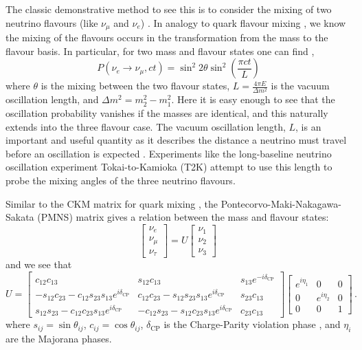 The classic demonstrative method to see this is to consider the mixing of two neutrino flavours (like $\nu_{\mu}$ and $\nu_{e}$) \cite{solar_nu}. In analogy to quark flavour mixing \cite{pdg_ckm}, we know the mixing of the flavours occurs in the transformation from the mass to the flavour basis. In particular, for two mass and flavour states one can find \cite{solar_nu},
\begin{equation}
  P(\nu_{e} \to \nu_{\mu}, ct) = \sin^{2}2\theta\sin^{2}\left(\frac{\pi ct}{L}\right)
\end{equation}
where $\theta$ is the mixing between the two flavour states, $L = \frac{4\pi E}{\Delta m^{2}}$ is the vacuum oscillation length, and $\Delta m^{2} = m_{2}^{2} - m_{1}^{2}$. Here it is easy enough to see that the oscillation probability vanishes if the masses are identical, and this naturally extends into the three flavour case. The vacuum oscillation length, $L$, is an important and useful quantity as it describes the distance a neutrino must travel before an oscillation is expected \cite{solar_nu}. Experiments like the long-baseline neutrino oscillation experiment Tokai-to-Kamioka (T2K) attempt to use this length to probe the mixing angles of the three neutrino flavours. 

Similar to the CKM matrix for quark mixing \cite{pdg_ckm}, the Pontecorvo-Maki-Nakagawa-Sakata (PMNS) matrix \cite{pmns} gives a relation between the mass and flavour states:
\begin{equation}
  \begin{bmatrix}
    \nu_{e} \\
    \nu_{\mu} \\
    \nu_{\tau}
  \end{bmatrix}
  =
  U
  \begin{bmatrix}
    \nu_{1} \\
    \nu_{2} \\
    \nu_{3}
  \end{bmatrix}
  \, 
\end{equation}
and we see that
\begin{equation}
  U = 
  \begin{bmatrix}
    c_{12}c_{13} & s_{12}c_{13} & s_{13}e^{-i\delta_{\text{CP}}} \\
    -s_{12}c_{23}-c_{12}s_{23}s_{13}e^{i\delta_{\text{CP}}} & c_{12}c_{23} - s_{12}s_{23}s_{13}e^{i\delta_{\text{CP}}} & s_{23}c_{13} \\
    s_{12}s_{23}-c_{12}c_{23}s_{13}e^{i\delta_{\text{CP}}} & -c_{12}s_{23} - s_{12}c_{23}s_{13}e^{i\delta_{\text{CP}}} & c_{23}c_{13}
  \end{bmatrix}
  \begin{bmatrix}
    e^{i\eta_{1}} & 0 & 0 \\
    0 & e^{i\eta_{2}} & 0 \\
    0 & 0 & 1
  \end{bmatrix}
  \, .
\end{equation}
where $s_{ij} = \sin\theta_{ij}$, $c_{ij}=\cos\theta_{ij}$, $\delta_{\text{CP}}$ is the Charge-Parity violation phase \cite{pmns}, and $\eta_{i}$ are the Majorana phases. 
